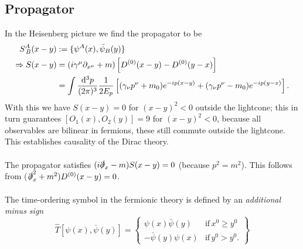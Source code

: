 \begin{enumerate}
\end{enumerate}

\subsection{Propagator}
In the Heisenberg picture we find the propagator to be
\begin{align}
	S^A_{\,B}(x-y) &:= \{\psi^A(x), \bar{\psi}_B(y) \} \\
	\Rightarrow S(x-y) &= (i \gamma^{\mu} \partial_{x^{\mu}}+m) \left[D^{(0)}(x-y) - D^{(0)}(y-x) \right]\\
	&= \int \frac{\mathrm{d}^3 p}{(2 \pi)^3} \frac{1}{2 E_p} \left[(\gamma_{\nu} p^{\nu} +m_0) e^{-ip(x-y)} + (\gamma_{\nu}p^{\nu} -m_0) e^{-ip(y-x)}  \right].
\end{align}
With this we have $S(x-y)=0$ for $(x-y)^2<0$ outside the lightcone; this in turn guarantees $[O_1(x),O_2(y)]=9$ for $(x-y)^2<0$, because all observables are bilinear in fermions, these still commute outside the lightcone. This establishes causality of the Dirac theory.\\
\\ The propagator satisfies $(i \slashed{\partial}_x -m)S(x-y)=0$ (because $p^2=m^2$). This follows from ($\slashed{\partial}^2_x + m^2) D^{(0)}(x-y) =0$.
\\
\\ The time-ordering symbol in the fermionic theory is defined by an \emph{additional minus sign}
\begin{equation}
	\hat{T}[\psi(x),\bar{\psi}(y)] = \left\{\begin{array}{lr}
	\psi(x)\bar{\psi}(y) & \mathrm{if} \, x^0 \geq y^0\\
	-\bar{\psi}(y) \psi(x) & \mathrm{if} \, y^0 > y^0.
	\end{array}		\right\}
\end{equation}
